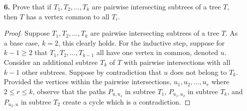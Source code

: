 \documentclass[ 12pt ]{article}
\begin{document}
\begin{enumerate}
		\begin{proof}
			\begin{enumerate}
				\item[\textbf{i.}] Consider the graph $K[X, Y]$ where $|X| = 2$ and $|Y| = n$. To create a spanning tree, let us first choose one vertex in $Y$ to be adjacent to
					both vertices in $X$ to ensure our tree is connected. With the remaining $n-1$ vertices in $Y$, draw a single edge between a vertex in $Y$ to an arbitrary vertex
					in $X$. Thus, the number of spanning trees of $K_{2, n}$ is $n2^{n-1}$.

				\item[\textbf{ii.}] Let $C_n$ denote the number of ordered full binary rooted trees with $n+1$ leaves. Observe that for every vertex in our tree, we have to assign
					leaves to the left and right children, dictating the form of the tree. Since we must ensure that at least one leaf is designated to both children, let us designate
					one leaf to always take the left child unless that right child has no leaves. Then it follows that $$C_n = C_0 C_{n-1} + C_1 C_{n-2} + \hdots + C_{n-1} C_0 = 
					\sum_{k = 0}^{n-1} C_k C_{n - k - 1}.$$ Also, notice that $C_0 = 1$ and so $C_n$ is the Catalan Numbers shifted by one index!
			\end{enumerate}
		\end{proof}


	\item[\textbf{6.}] Prove that if $T_1, T_2, \hdots, T_k$ are pairwise intersecting subtrees of a tree $T$, then $T$ has a vertex common to all $T_i$.

		\begin{proof}
			Suppose $T_1, T_2, \hdots, T_k$ are pairwise intersecting subtrees of a tree $T$. As a base case, $k = 2$, this clearly holds. For the inductive step, suppose
			for $k-1 \geq 2$ that $T_1, T_2, \hdots, T_{k-1}$ all have one vertex in common, denoted $u$. Consider an additional subtree $T_k$ of $T$ with pairwise intersections with
			all $k-1$ other subtrees. Suppose by contradiction that $u$ does not belong to $T_k$. Provided the vertices within the pairwise intersections, $u_1, u_2, \hdots, u_r$ where
			$2 \leq r \leq k$, observe that the paths $P_{u, u_1}$ in subtree $T_1$, $P_{u_1, u_2}$ in subtree $T_k$, and $P_{u_2, u}$ in subtree $T_2$ create a cycle which is a
			contradiction.
		\end{proof}
\end{enumerate}
\end{document}
